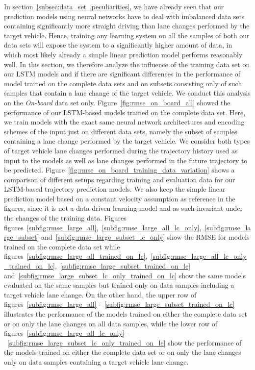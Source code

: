 In section~\ref{subsec:data_set_peculiarities}, we have already seen that our prediction models using neural networks have to deal with imbalanced data sets containing significantly more straight driving than lane changes performed by the target vehicle.
Hence, training any learning system on all the samples of both our data sets will expose the system to a significantly higher amount of data, in which most likely already a simple linear prediction model performs reasonably well. 
In this section, we therefore analyze the influence of the training data set on our \ac{LSTM} models and if there are significant differences in the performance of model trained on the complete data sets and on subsets consisting only of such samples that contain a lane change of the target vehicle.
We conduct this analysis on the \emph{On-board} data set only.
Figure~\ref{fig:rmse_on_board_all} showed the performance of our \ac{LSTM}-based models trained on the complete data set.
Here, we train models with the exact same neural network architectures and encoding schemes of the input just on different data sets, namely the subset of samples containing a lane change performed by the target vehicle.
We consider both types of target vehicle lane changes performed during the trajectory history used as input to the models as well as lane changes performed in the future trajectory to be predicted.
Figure~\ref{fig:rmse_on_board_training_data_variation} shows a comparison of different setups regarding training and evaluation data for our \ac{LSTM}-based trajectory prediction models.
We also keep the simple linear prediction model based on a constant velocity assumption as reference in the figures, since it is not a data-driven learning model and as such invariant under the changes of the training data.
Figures figures~\ref{subfig:rmse_large_all},~\ref{subfig:rmse_large_all_lc_only},~\ref{subfig:rmse_large_subset} and~\ref{subfig:rmse_large_subset_lc_only} show the \ac{RMSE} for models trained on the complete data set while figures~\ref{subfig:rmse_large_all_trained_on_lc},~\ref{subfig:rmse_large_all_lc_only_trained_on_lc},~\ref{subfig:rmse_large_subset_trained_on_lc} and~\ref{subfig:rmse_large_subset_lc_only_trained_on_lc} show the same models evaluated on the same samples but trained
only on data samples including a target vehicle lane change.
On the other hand, the upper row of figures~\ref{subfig:rmse_large_all} -~\ref{subfig:rmse_large_subset_trained_on_lc} illustrates the performance of the models trained on either the complete data set or on only the lane changes on all data samples, while the lower row of figures~\ref{subfig:rmse_large_all_lc_only} -~\ref{subfig:rmse_large_subset_lc_only_trained_on_lc} show the performance of the models trained on either the complete data set or on only the lane changes only on data samples containing a target vehicle lane change.

